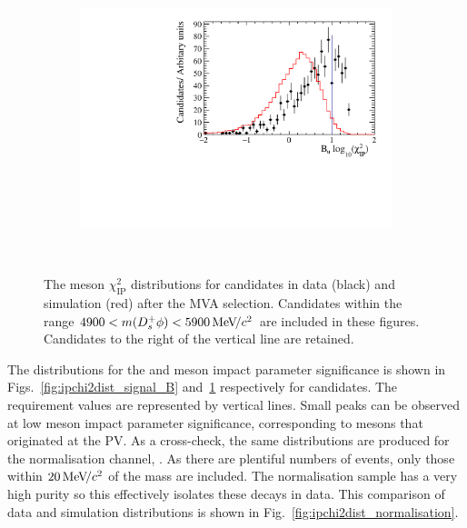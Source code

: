 \begin{figure}[!h]
\begin{subfigure}[t]{0.32\textwidth}
      \includegraphics[width=1.0\textwidth]{figs/Selection/Data_MC_Comparison_Var_1_B2DsPhi_Ds2KPiPi.pdf}
      \caption{\decay{\Dsp}{\Kp\pim\pip}}
   \end{subfigure}\\
   \caption{The \Dsp meson $\chi^{2}_{\text{IP}}$ distributions for \decay{\Bp}{\Dsp\phiz} candidates in data (black) and simulation (red) after the MVA selection. Candidates within the range $4900 < m({{D}^+_{s}}\phi) < 5900 {\mathrm{\,Me\kern -0.1em V\!/}c^2}$ are included in these figures. Candidates to the right of the vertical line are retained.}
   \label{fig:ipchi2dist_signal_D}   
\end{figure}

The distributions for the \Bp and \Dsp meson impact parameter significance is shown in Figs.~\ref{fig:ipchi2dist_signal_B} and~\ref{fig:ipchi2dist_signal_D} respectively for \decay{\Bp}{\Dsp\phiz} candidates. The requirement values are represented by vertical lines. Small peaks can be observed at low \Dsp meson impact parameter significance, corresponding to \Dsp mesons that originated at the PV. 
As a cross-check, the same distributions are produced for the normalisation channel, \decay{\Bp}{\Dsp\Dzb}. 
As there are plentiful numbers of events, only those within $20{\mathrm{\,Me\kern -0.1em V\!/}c^2}$ of the \Bp mass are included. The normalisation sample has a very high purity so this effectively isolates these decays in data. This comparison of data and simulation distributions is shown in Fig.~\ref{fig:ipchi2dist_normalisation}.


